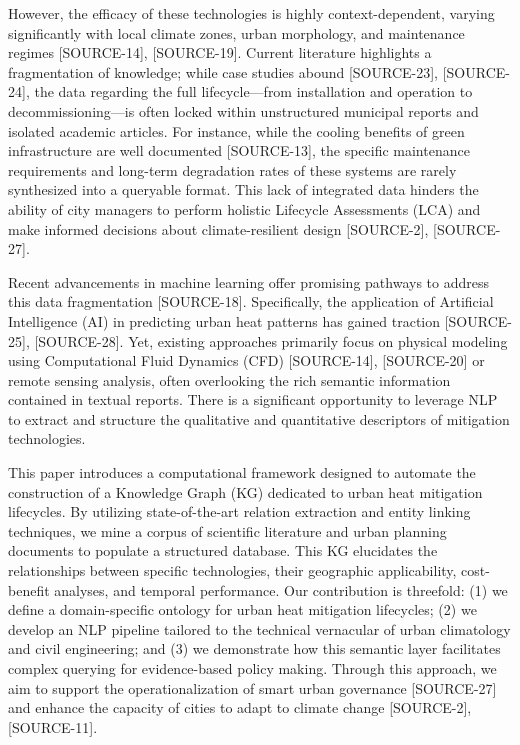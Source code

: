 \documentclass{article}
\begin{document}
However, the efficacy of these technologies is highly context-dependent, varying significantly with local climate zones, urban morphology, and maintenance regimes [SOURCE-14], [SOURCE-19]. Current literature highlights a fragmentation of knowledge; while case studies abound [SOURCE-23], [SOURCE-24], the data regarding the full lifecycle—from installation and operation to decommissioning—is often locked within unstructured municipal reports and isolated academic articles. For instance, while the cooling benefits of green infrastructure are well documented [SOURCE-13], the specific maintenance requirements and long-term degradation rates of these systems are rarely synthesized into a queryable format. This lack of integrated data hinders the ability of city managers to perform holistic Lifecycle Assessments (LCA) and make informed decisions about climate-resilient design [SOURCE-2], [SOURCE-27].

Recent advancements in machine learning offer promising pathways to address this data fragmentation [SOURCE-18]. Specifically, the application of Artificial Intelligence (AI) in predicting urban heat patterns has gained traction [SOURCE-25], [SOURCE-28]. Yet, existing approaches primarily focus on physical modeling using Computational Fluid Dynamics (CFD) [SOURCE-14], [SOURCE-20] or remote sensing analysis, often overlooking the rich semantic information contained in textual reports. There is a significant opportunity to leverage NLP to extract and structure the qualitative and quantitative descriptors of mitigation technologies.

This paper introduces a computational framework designed to automate the construction of a Knowledge Graph (KG) dedicated to urban heat mitigation lifecycles. By utilizing state-of-the-art relation extraction and entity linking techniques, we mine a corpus of scientific literature and urban planning documents to populate a structured database. This KG elucidates the relationships between specific technologies, their geographic applicability, cost-benefit analyses, and temporal performance. Our contribution is threefold: (1) we define a domain-specific ontology for urban heat mitigation lifecycles; (2) we develop an NLP pipeline tailored to the technical vernacular of urban climatology and civil engineering; and (3) we demonstrate how this semantic layer facilitates complex querying for evidence-based policy making. Through this approach, we aim to support the operationalization of smart urban governance [SOURCE-27] and enhance the capacity of cities to adapt to climate change [SOURCE-2], [SOURCE-11].
\end{document}
